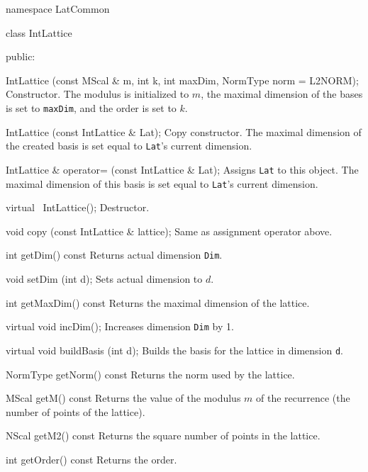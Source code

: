namespace LatCommon {

class IntLattice {
public:

   IntLattice (const MScal & m, int k, int maxDim, NormType norm = L2NORM);
\endcode
\tabb
  Constructor. The modulus is initialized to $m$, the maximal dimension of the
  bases is set to \texttt{maxDim}, and the order is set to $k$.
\endtabb
\code

   IntLattice (const IntLattice & Lat);
\endcode
\tabb
  Copy constructor. The maximal dimension of the
  created basis is set equal to \texttt{Lat}'s current dimension.
\endtabb
\code

   IntLattice & operator= (const IntLattice & Lat);
\endcode
\tabb
 Assigns \texttt{Lat} to this object. The maximal dimension of this
  basis is set equal to \texttt{Lat}'s current dimension.
\endtabb
\code

   virtual ~IntLattice();
\endcode
\tabb
Destructor.
\endtabb
\code

   void copy (const IntLattice & lattice);
\endcode
\tabb
Same as assignment operator above.
\endtabb
\code

   int getDim() const  \endhide
\endcode
\tabb
Returns actual dimension \texttt{Dim}.
\endtabb
\code

   void setDim (int d);
\endcode
\tabb
Sets actual dimension to $d$.
\endtabb
\code

   int getMaxDim() const  \endhide
\endcode
\tabb
Returns the maximal dimension of the lattice.
\endtabb
\code

   virtual void incDim();
\endcode
\tabb
Increases dimension \texttt{Dim} by 1.
\endtabb
\code

   virtual void buildBasis (int d);
\endcode
\tabb
Builds the basis for the lattice in dimension \texttt{d}.
\endtabb
\code

   NormType getNorm() const  \endhide
\endcode
\tabb
Returns the norm used by the lattice.
\endtabb
\code

   MScal getM() const  \endhide
\endcode
\tabb
  Returns the value of the modulus $m$ of the recurrence (the number of points
  of the lattice).
\endtabb
\code

   NScal getM2() const  \endhide
\endcode
\tabb
Returns the square number of points in the lattice.
\endtabb
\code

   int getOrder() const  \endhide
\endcode
\tabb
Returns the order.
\endtabb
\code

}}
